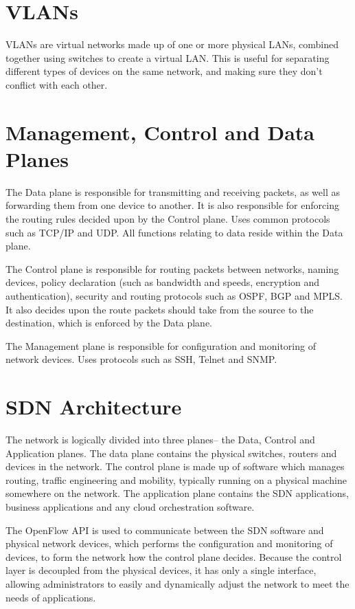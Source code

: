 
\section*{VLANs}

VLANs are virtual networks made up of one or more physical LANs, combined together using switches to create a virtual
 LAN. This is useful for separating different types of devices on the same network, and making sure they don't conflict
 with each other.

\section*{Management, Control and Data Planes}

The Data plane is responsible for transmitting and receiving packets, as well as forwarding them from one device to
 another. It is also responsible for enforcing the routing rules decided upon by the Control plane. Uses common
 protocols such as TCP/IP and UDP. All functions relating to data reside within the Data plane.

The Control plane is responsible for routing packets between networks, naming devices, policy declaration (such as
 bandwidth and speeds, encryption and authentication), security and routing protocols such as OSPF, BGP and MPLS. It
 also decides upon the route packets should take from the source to the destination, which is enforced by the Data
 plane.

The Management plane is responsible for configuration and monitoring of network devices. Uses protocols such as SSH,
 Telnet and SNMP.

\section*{SDN Architecture}

The network is logically divided into three planes-- the Data, Control and Application planes. The data plane contains 
 the physical switches, routers and devices in the network. The control plane is made up of software which manages
 routing, traffic engineering and mobility, typically running on a physical machine somewhere on the network. The
 application plane contains the SDN applications, business applications and any cloud orchestration software.

The OpenFlow API is used to communicate between the SDN software and physical network devices, which performs the
 configuration and monitoring of devices, to form the network how the control plane decides. Because the control layer
 is decoupled from the physical devices, it has only a single interface, allowing administrators to easily and
 dynamically adjust the network to meet the needs of applications.


